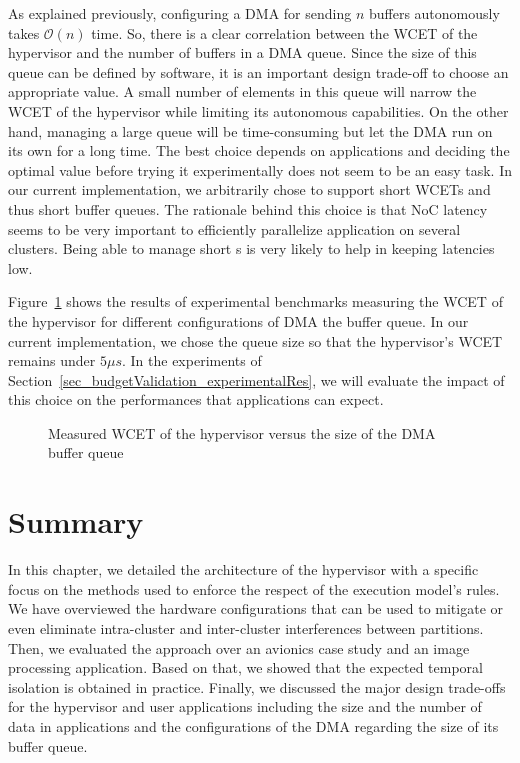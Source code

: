 \documentclass[main.tex]{subfiles}
\begin{document}
As explained previously, configuring a DMA for sending $n$ buffers autonomously
takes $\mathcal{O}(n)$ time. So, there is a clear correlation between the WCET
of the hypervisor and the number of buffers in a DMA queue. Since the size of
this queue can be defined by software, it is an important design trade-off to
choose an appropriate value. A small number of elements in this queue will
narrow the WCET of the hypervisor while limiting its autonomous capabilities.
On the other hand, managing a large queue will be time-consuming but let the
DMA run on its own for a long time. The best choice depends on applications and
deciding the optimal value before trying it experimentally does not seem to be
an easy task. In our current implementation, we arbitrarily chose to support
short WCETs and thus short buffer queues. The rationale behind this choice is
that NoC latency seems to be very important to efficiently parallelize
application on several clusters. Being able to manage short \PC{}s is very
likely to help in keeping latencies low. 

Figure~\ref{fig_implemExecModel_WCETvsNbBufs} shows the results of experimental
benchmarks measuring the WCET of the hypervisor for different configurations of
DMA the buffer queue. In our current implementation, we chose the queue size so
that the hypervisor's WCET remains under $5 \mu s$. In the experiments of
Section~\ref{sec_budgetValidation_experimentalRes}, we will evaluate the impact
of this choice on the performances that applications can expect.

\begin{figure}
    \centering
    \scalebox{1}{}
    \caption{Measured WCET of the hypervisor versus the size of the DMA buffer
    queue}
    \label{fig_implemExecModel_WCETvsNbBufs}
\end{figure}

\section{Summary}
In this chapter, we detailed the architecture of the hypervisor with a specific
focus on the methods used to enforce the respect of the execution model's
rules. We have overviewed the hardware configurations that can be used to
mitigate or even eliminate intra-cluster and inter-cluster interferences
between partitions. Then, we evaluated the approach over an avionics case study
and an image processing application. Based on that, we showed that the expected
temporal isolation is obtained in practice. Finally, we discussed the major
design trade-offs for the hypervisor and user applications including the size
and the number of data in applications and the configurations of the DMA
regarding the size of its buffer queue. 
\end{document}
